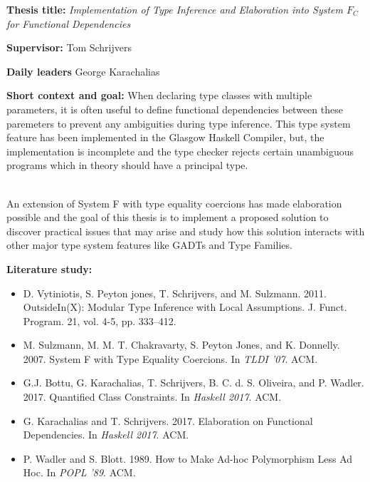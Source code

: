 \documentclass[12pt]{report}
\begin{document}
\pagestyle{myheadings}

{\bf Thesis title:} {\em Implementation of Type Inference and Elaboration into System $F_C$ for Functional Dependencies}

\vspace{0.5cm}
{\bf Supervisor:} Tom Schrijvers


\vspace{0.5cm}
{\bf Daily leaders} George Karachalias

\vspace{1cm}
{\bf Short context and goal: }
When declaring type classes with multiple parameters, it is often useful to
define functional dependencies between these paremeters to prevent any
ambiguities during type inference. This type system feature has been implemented
in the Glasgow Haskell Compiler, but, the implementation is incomplete and the
type checker rejects certain unambiguous programs which in theory should have a
principal type. %

\mbox{}\\
An extension of System F with type equality coercions has made elaboration
possible and the goal of this thesis is to implement a proposed solution to
discover practical issues that may arise and study how this solution interacts
with other major type system features like GADTs and Type Families.

\vspace{1cm}
{\bf Literature study:}
\begin{itemize} %
\item
  D. Vytiniotis, S. Peyton jones, T. Schrijvers, and M. Sulzmann. 2011.
  OutsideIn(X): Modular Type Inference with Local Assumptions. J. Funct.
  Program. 21, vol. 4-5, pp. 333--412.
\item
  M. Sulzmann, M. M. T. Chakravarty, S. Peyton Jones, and K. Donnelly. 2007.
  System F with Type Equality Coercions.
  In \textit{TLDI '07}. ACM.
\item
  G.J. Bottu, G. Karachalias, T. Schrijvers, B. C. d. S. Oliveira, and P. Wadler. 2017.
  Quantified Class Constraints.
  In \textit{Haskell 2017}. ACM.
\item
  G. Karachalias and T. Schrijvers. 2017.
  Elaboration on Functional Dependencies. %
  In \textit{Haskell 2017}. ACM.
\item
  P. Wadler and S. Blott. 1989.
  How to Make Ad-hoc Polymorphism Less Ad Hoc.
  In \textit{POPL '89}. ACM.
\end{itemize}
\end{document}
